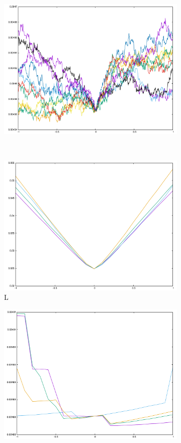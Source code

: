 {\begin{figure}[H]
\begin{subfigure}{.33\textwidth}
	\includegraphics[width=\linewidth]{fig/ajherr/t3rr/S_chi.pdf}
\end{subfigure}\\
\begin{subfigure}{.33\textwidth}
	\includegraphics[width=\linewidth]{fig/ajherr/t3rr/L_mae.pdf}
	\caption{L}
\end{subfigure}%
\begin{subfigure}{.33\textwidth}
	\includegraphics[width=\linewidth]{fig/ajherr/t3rr/M_mae.pdf}

\end{subfigure}
\end{figure}}
